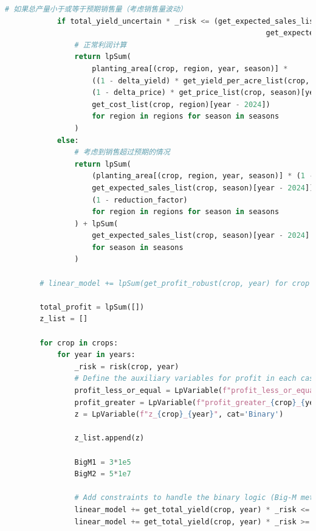 \documentclass{cumcmthesis}
\begin{document}
\begin{appendices}
\begin{lstlisting}[language=python]
            # 如果总产量小于或等于预期销售量（考虑销售量波动）
            if total_yield_uncertain * _risk <= (get_expected_sales_list(crop, '第一季')[year - 2024] * (1 - delta_sales) +
                                                            get_expected_sales_list(crop, '第二季')[year - 2024] * (1 - delta_sales)):
                # 正常利润计算
                return lpSum(
                    planting_area[(crop, region, year, season)] *
                    ((1 - delta_yield) * get_yield_per_acre_list(crop, region)[year - 2024] * 
                    (1 - delta_price) * get_price_list(crop, season)[year - 2024] * _risk -
                    get_cost_list(crop, region)[year - 2024])
                    for region in regions for season in seasons
                )
            else:
                # 考虑到销售超过预期的情况
                return lpSum(
                    (planting_area[(crop, region, year, season)] * (1 - delta_yield) * get_yield_per_acre_list(crop, region)[year - 2024] -
                    get_expected_sales_list(crop, season)[year - 2024]) * (1 - delta_price) * get_price_list(crop, season)[year - 2024] *
                    (1 - reduction_factor)
                    for region in regions for season in seasons
                ) + lpSum(
                    get_expected_sales_list(crop, season)[year - 2024] * (1 - delta_price) * get_price_list(crop, season)[year - 2024]
                    for season in seasons
                )
    
        # linear_model += lpSum(get_profit_robust(crop, year) for crop in crops for year in years)
    
        total_profit = lpSum([])
        z_list = []
    
        for crop in crops:
            for year in years:
                _risk = risk(crop, year)
                # Define the auxiliary variables for profit in each case
                profit_less_or_equal = LpVariable(f"profit_less_or_equal_{crop}_{year}", lowBound=0)
                profit_greater = LpVariable(f"profit_greater_{crop}_{year}", lowBound=0)
                z = LpVariable(f"z_{crop}_{year}", cat='Binary')
    
                z_list.append(z)
    
                BigM1 = 3*1e5
                BigM2 = 5*1e7
    
                # Add constraints to handle the binary logic (Big-M method)
                linear_model += get_total_yield(crop, year) * _risk <= get_expected_sales_list(crop, '第一季')[year-2024] + get_expected_sales_list(crop, '第二季')[year-2024] + BigM1 * (1 - z)
                linear_model += get_total_yield(crop, year) * _risk >= get_expected_sales_list(crop, '第一季')[year-2024] + get_expected_sales_list(crop, '第二季')[year-2024] - BigM1 * z
    

\end{lstlisting}
\end{appendices}
\end{document}
